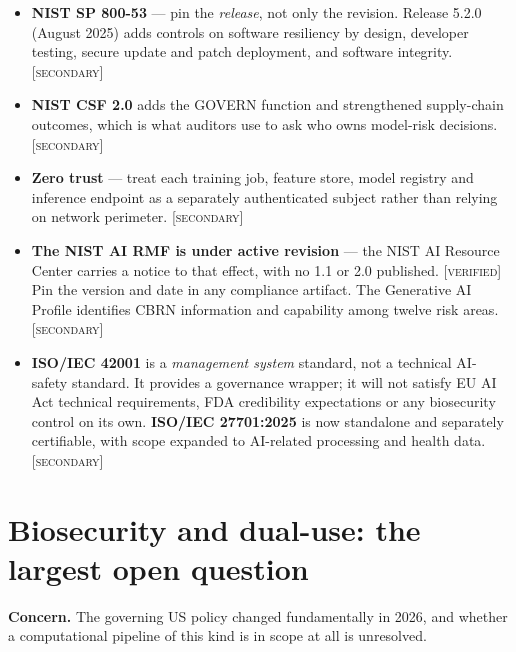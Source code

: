 \documentclass[11pt,a4paper]{article}
\newcommand{\flag}[1]{\textcolor{flagcolor}{\textbf{#1}}}
\newcommand{\verified}{\textsc{[verified]}}
\newcommand{\secondary}{\textsc{[secondary]}}
\newcommand{\concern}[1]{\par\medskip\noindent\textbf{Concern.} #1}
\begin{document}
\begin{itemize}
  \item \textbf{NIST SP 800-53} \citep{nist80053} --- pin the
  \emph{release}, not only the revision. Release 5.2.0 (August 2025) adds
  controls on software resiliency by design, developer testing, secure
  update and patch deployment, and software integrity. \secondary
  \item \textbf{NIST CSF 2.0} \citep{nistcsf2} adds the GOVERN function and
  strengthened supply-chain outcomes, which is what auditors use to ask who
  owns model-risk decisions. \secondary
  \item \textbf{Zero trust} \citep{nist800207} --- treat each training job,
  feature store, model registry and inference endpoint as a separately
  authenticated subject rather than relying on network perimeter.
  \secondary
  \item \flag{The NIST AI RMF is under active revision}
  \citep{nistairmf} --- the NIST AI Resource Center carries a notice to that
  effect, with no 1.1 or 2.0 published. \verified{} Pin the version and date
  in any compliance artifact. The Generative AI Profile
  \citep{nistai6001} identifies CBRN information and capability among twelve
  risk areas. \secondary
  \item \textbf{ISO/IEC 42001} \citep{iso42001} is a \emph{management
  system} standard, not a technical AI-safety standard. It provides a
  governance wrapper; it will not satisfy EU AI Act technical requirements,
  FDA credibility expectations or any biosecurity control on its own.
  \flag{ISO/IEC 27701:2025} \citep{iso27701} is now standalone and
  separately certifiable, with scope expanded to AI-related processing and
  health data. \secondary
\end{itemize}

\section{Biosecurity and dual-use: the largest open question}
\label{sec:biosecurity}

\concern{The governing US policy changed fundamentally in 2026, and whether
a computational pipeline of this kind is in scope at all is unresolved.}
\end{document}
